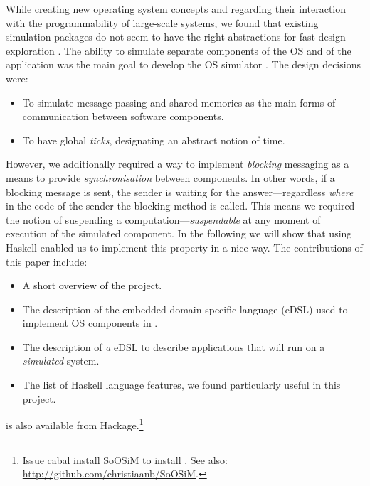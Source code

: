While creating new operating system concepts and regarding their interaction with the programmability of large-scale systems, we found that existing simulation packages do not seem to have the right abstractions for fast design exploration \cite{cotson,omnet}.
The ability to simulate separate components of the OS and of the application was the main goal to develop the OS simulator \soosim \cite{Baaij:2012}.
The design decisions were:
\begin{itemize}
\item To simulate message passing and shared memories as the main forms of communication between software components.
\item To have global \emph{ticks}, designating an abstract notion of time.
\end{itemize}
However, we additionally required a way to implement \emph{blocking} messaging as a means to provide \emph{synchronisation} between components.
In other words, if a blocking message is sent, the sender is waiting for the answer---regardless \emph{where} in the code of the sender the blocking  method is called.
This means we required the notion of suspending a computation---\emph{suspendable} at any moment of execution of the simulated component.
In the following we will show that using Haskell\nolinebreak[3] \cite{haskell-report} enabled us to implement this property in a nice way.
The contributions of this paper include:
\begin{itemize}
\item A short overview of the \soosim project.
\item The description of the embedded domain-specific language (eDSL) used to implement OS components in \soosim.
\item The description of \emph{a} eDSL to describe applications that will run on a \soosim \emph{simulated} system.
\item The list of Haskell language features, we found particularly useful in this project.
\end{itemize}
\soosim is also available from Hackage.\footnote{Issue \textsf{cabal install SoOSiM} to install \soosim. See also:
\url{http://github.com/christiaanb/SoOSiM}.}

